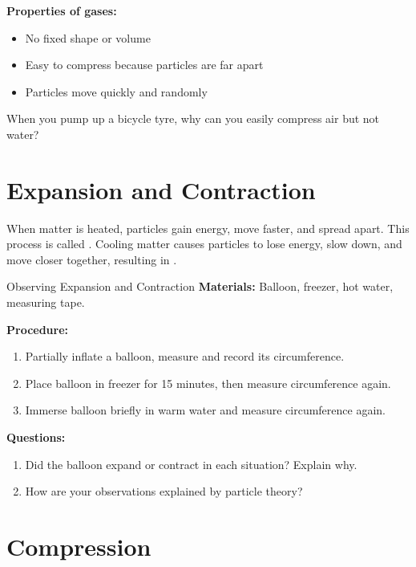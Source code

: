\textbf{Properties of gases:}
\begin{itemize}
    \item No fixed shape or volume
    \item Easy to compress because particles are far apart
    \item Particles move quickly and randomly
\end{itemize}

\begin{stopandthink}
When you pump up a bicycle tyre, why can you easily compress air but not water?
\end{stopandthink}

\section{Expansion and Contraction}

When matter is heated, particles gain energy, move faster, and spread apart. This process is called . Cooling matter causes particles to lose energy, slow down, and move closer together, resulting in .

\begin{investigation}{Observing Expansion and Contraction}
\textbf{Materials:} Balloon, freezer, hot water, measuring tape.

\textbf{Procedure:}
\begin{enumerate}
    \item Partially inflate a balloon, measure and record its circumference.
    \item Place balloon in freezer for 15 minutes, then measure circumference again.
    \item Immerse balloon briefly in warm water and measure circumference again.
\end{enumerate}

\textbf{Questions:}
\begin{enumerate}
    \item Did the balloon expand or contract in each situation? Explain why.
    \item How are your observations explained by particle theory?
\end{enumerate}
\end{investigation}

\section{Compression}

